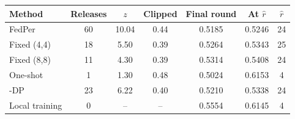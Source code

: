 \begin{tabular}{@{}lcccccc@{}}
\toprule
Method & Releases & $z$ & Clipped & Final round & At $\hat r$ & $\hat r$\\
\midrule
FedPer & 60 & 10.04 & 0.44 & 0.5185 & 0.5246 & 24\\
Fixed (4,4) & 18 & 5.50 & 0.39 & 0.5264 & 0.5343 & 25\\
Fixed (8,8) & 11 & 4.30 & 0.39 & 0.5314 & 0.5408 & 24\\
One-shot & 1 & 1.30 & 0.48 & 0.5024 & 0.6153 & 4\\
\tierfed{}-DP & 23 & 6.22 & 0.40 & 0.5210 & 0.5338 & 24\\
\midrule
Local training & 0 & -- & -- & 0.5554 & 0.6145 & 4\\
\bottomrule
\end{tabular}
